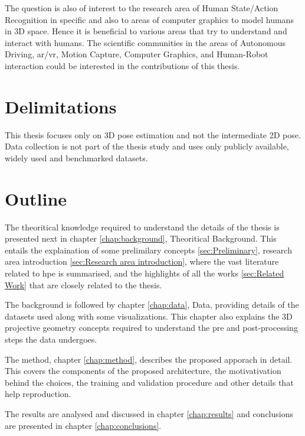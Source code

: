 The question is also of interest to the research area of Human State/Action Recognition in specific and also to areas of computer graphics to model humans in 3D space. Hence it is beneficial to various areas that try to understand and interact with humans. The scientific communities in the areas of Autonomous Driving, \ac{ar/vr}, Motion Capture, Computer Graphics, and Human-Robot interaction could be interested in the contributions of this thesis.

\section{Delimitations}
\label{sec:delimitations}
This thesis focuses only on 3D pose estimation and not the intermediate 2D pose. Data collection is not part of the thesis study and uses only publicly available, widely used and benchmarked datasets.

\section{Outline}
\label{sec:outline}
The theoritical knowledge required to understand the details of the thesis is presented next in chapter \ref{chap:background}, Theoritical Background. This entails the explaination of some prelimilary concepts \ref{sec:Preliminary}, research area introduction \ref{sec:Research area introduction}, where the vast literature related to \ac{hpe} is summarised, and the highlights of all the works \ref{sec:Related Work} that are closely related to the thesis.

The background is followed by chapter \ref{chap:data}, Data,  providing details of the datasets used along with some visualizations. This chapter also explains the 3D projective geometry concepts required to understand the pre and post-processing steps the data undergoes.

The method, chapter \ref{chap:method}, describes the proposed apporach in detail. This covers the components of the proposed architecture, the motivativation behind the choices, the training and validation procedure and other details that help reproduction.

The results are analysed and discussed in chapter \ref{chap:results} and conclusions are presented in chapter \ref{chap:conclusions}.



